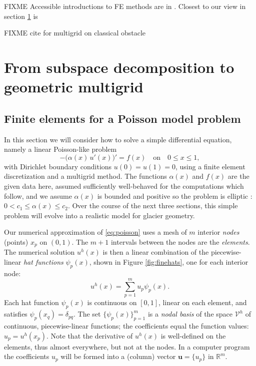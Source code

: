 \documentclass[letterpaper,final,12pt,reqno]{amsart}
\theoremstyle{claim}
\newcommand{\RR}{\mathbb{R}}
\newcommand{\bu}{\mathbf{u}}
\numberwithin{equation}{section}
\numberwithin{figure}{section}
\numberwithin{table}{section}
\numberwithin{theorem}{section}
\begin{document}
FIXME Accessible introductions to FE methods are in \cite{Bueler2021,Elmanetal2014,Johnson2009}.  Closest to our view in section \ref{sec:subspace} is \cite[Chapter V]{Braess2007}

FIXME cite for multigrid on classical obstacle \cite{BrandtCryer1983,Bueler2021,GraeserKornhuber2009}


\section{From subspace decomposition to geometric multigrid} \label{sec:subspace}

\subsection*{Finite elements for a Poisson model problem}  In this section we will consider how to solve a simple differential equation, namely a linear Poisson-like problem
\begin{equation}
- \big(\alpha(x)\,u'(x)\big)' = f(x) \quad \text{on} \quad 0 \le x \le 1, \label{eq:poisson}
\end{equation}
with Dirichlet boundary conditions $u(0)=u(1)=0$, using a finite element discretization and a multigrid method.  The functions $\alpha(x)$ and $f(x)$ are the given data here, assumed sufficiently well-behaved for the computations which follow, and we assume $\alpha(x)$ is bounded and positive so the problem is elliptic \cite{Evans2010}: $0 < c_1 \le \alpha(x) \le c_2$.  Over the course of the next three sections, this simple problem will evolve into a realistic model for glacier geometry.

Our numerical approximation of \eqref{eq:poisson} uses a mesh of $m$ interior \emph{nodes} (points) $x_p$ on $(0,1)$.  The $m+1$ intervals between the nodes are the \emph{elements}.  The numerical solution $u^h(x)$ is then a linear combination of the piecewise-linear \emph{hat functions} $\psi_p(x)$, shown in Figure \ref{fig:finehats}, one for each interior node:
\begin{equation}
u^h(x) = \sum_{p=1}^m u_p \psi_p(x). \label{eq:trialsolution}
\end{equation}
Each hat function $\psi_p(x)$ is continuous on $[0,1]$, linear on each element, and satisfies $\psi_p(x_q) = \delta_{pq}$.  The set $\{\psi_p(x)\}_{p=1}^m$ is a \emph{nodal basis} of the space $\mathcal{V}^h$ of continuous, piecewise-linear functions; the coefficients equal the function values: $u_p=u^h(x_p)$.  Note that the derivative of $u^h(x)$ is well-defined on the elements, thus almost everywhere, but not at the nodes.  In a computer program the coefficients $u_p$ will be formed into a (column) vector $\bu=\{u_p\}$ in $\RR^m$.
\end{document}
